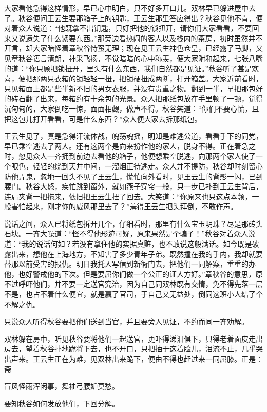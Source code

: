 \documentclass[12pt,UTF8]{ctexbook}
\begin{document}
{{{大家看他急得这样情形，早已心中明白，只不好多开口儿。双林早已躲进屋中去了。秋谷便问王云生要那箱子上的钥匙，王云生那里答应得出？秋谷见他不肯，便对着众人说道：“他既拿不出钥匙，只好把他的锁扭开，请你们大家看看，不要回来又说遗失了什么紧要东西。”那旁边看热闹的客人以及栈内的茶房，初时虽然并不开言，却大家暗怪着章秋谷恃蛮无理；现在见王云生神色仓皇，已经露了马脚，又见章秋谷语言清朗，神采飞扬，不觉暗暗的心中称羡，便大家附和起来，七张八嘴的道：“你只顾把锁扭开，里头有什么东西，我们自然都是见证。”秋谷听了甚是欢喜，便把那两只衣箱的锁轻轻一扭，把锁硬扭成两断，打开箱盖。大家近前看时，只见箱面上都是些半新不旧的男女衣服，并没有贵重之物。翻到一半，早把那包好的砖石翻了出来，每箱约有十余包的光景。众人把那纸包放在手里顿了一顿，觉得沉甸甸的，大家倒吃一惊，面面相觑，做声不得。秋谷笑道：“你们不要心慌，且把这包儿打开看看，可是什么东西？”众人便大家去拆那纸包。

王云生见了，真是急得汗流体战，魄荡魂摇，明知是难逃公道，看看手下的同党，早已乘空逃去了两人。还有这两个是向来扮作他的家人，脱身不得。正在着急之时，忽见众人一齐拥到前边去看他的箱子，他便想乘空脱逃，向那两个家人使了一个眼色，轻轻的绕到天井中间，一溜烟正待逃走。众人并不提防，秋谷却时刻留心防他弄鬼，忽地一回头不见了王云生，慌忙向外看时，见王云生的背影一闪，已到腰门。秋谷大怒，疾忙跳到窗外，就如燕子穿帘一般，只一步已扑到王云生背后，连肩夹背一把拖来，依旧把王云生扭了回去。大笑道：“你原来也只这点本领，一般害怕起来，刚才你的威风那里去了？”羞得王云生把头拜倒，不敢作声。

说话之间，众人已将纸包拆开几个，仔细看时，那里有什么宝玉明珠？尽是那砖头石块。一齐大噪道：“怪不得他形迹可疑，原来果然是个骗子！”秋谷对着众人说道：“我的说话何如？若没有拿住他的实据真赃，也不敢说这般满话。如今既是破露出来，想他在上海地方，不知害了多少青年子弟。既然撞在我的手内，我却就要替那以前受害的报仇。明日我托人写信到新衙门去，把他们一同解案，重重的办他，也好警戒他的下次。但是要屈你们做一个公正的证人方好。”章秋谷的意思，原不过呼吓他们，并不要一定送官究治，因为自己同双林既有交情，免不得先落一层不是，也占不着什么便宜，就是赢了官司，于自己又无益处，倒同这班小人结了个不解之仇。

只说众人听得秋谷要把他们送到当官，并且要旁人见证，不约而同一齐劝解。

双林躲在房中，听见秋谷要将他们一起送官，更吓得涕泪俱下，只得老着面皮走出房去，望着秋谷扑地跪将下去，也不开口，只把抽于这着脸儿，泪流不止，几乎哭出声来。王云生正在为难，见双林出来跪下，便由不得也赶过来一同屈膝。正是：斋

盲风怪雨浑闲事，舞袖弓腰妒莫愁。

要知秋谷如何发放他们，下回分解。





}}}
\end{document}
